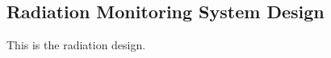 \subsection{Radiation Monitoring System Design}
\label{sec:Radiation Design}

This is the radiation design.
